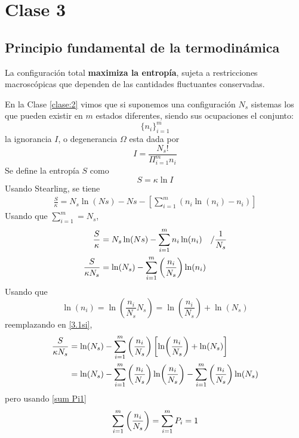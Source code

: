 \section{Clase 3}\label{clase:3}
\subsection{Principio fundamental de la termodinámica}
\begin{tcolorbox}
La configuración total \textbf{maximiza la entropía}, sujeta a restricciones macroscópicas que dependen de las cantidades fluctuantes conservadas.
\end{tcolorbox}

En la Clase \ref{clase:2} vimos que si suponemos una configuración $N_s$ sistemas los que pueden existir en $m$ estados diferentes, siendo sus ocupaciones el conjunto:
\begin{equation}
  \{n_i\}_{i=1}^m
\end{equation}
la ignorancia $I$, o degenerancia $\Omega$ esta dada por
\begin{equation}
  \boxed{I=\frac{N_s!}{\Pi_{i=1}^mn_i}}
\end{equation}
Se define la entropía $S$ como
\begin{equation}
  \boxed{S=\kappa \ln I}
\end{equation}
Usando Stearling, se tiene
\begin{align}
  \frac{S}{\kappa}=N_s\ln (Ns)-Ns-\left[\sum_{i=1}^m\left(n_i\ln (n_i)-n_i\right)\right]
\end{align}
Usando que $\sum_{i=1}^m=N_s$,
\begin{align}
  \frac{S}{\kappa}&=N_s\ln (Ns)-\sum_{i=1}^m n_i\ln(n_i)\quad /\frac{1}{N_s}\\
  \frac{S}{\kappa N_s}&=\ln(N_s)-\sum_{i=1}^m\left(\frac{n_i}{N_s}\right)\ln (n_i)\label{3.1si}
\end{align}
Usando que
\begin{equation}
  \ln(n_i)=\ln\left(\frac{n_i}{N_s}N_s\right)=\ln\left(\frac{n_i}{N_s}\right)+\ln(N_s)
\end{equation}
reemplazando en \eqref{3.1si},
\begin{align}
  \frac{S}{\kappa N_s}&=\ln (N_s)-\sum_{i=1}^m\left(\frac{n_i}{N_s}\right)\left[\ln(\frac{n_i}{N_s})+\ln (N_s)\right]\\
  &=\ln(N_s)-\sum_{i=1}^m \left(\frac{n_i}{N_s}\right)\ln(\frac{n_i}{N_s})-\sum_{i=1}^m \left(\frac{n_i}{N_s}\right)\ln(N_s)
\end{align}
pero usando \eqref{sum Pi1}
\begin{equation}
  \sum_{i=1}^m \left(\frac{n_i}{N_s}\right)=\sum_{i=1}^m P_i=1
\end{equation}
